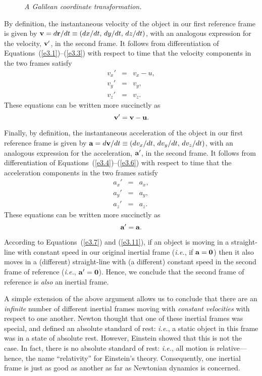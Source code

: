 \begin{figure}
\epsfysize=2.25in
\centerline{}
\caption{\em A Galilean coordinate transformation.}\label{fun1}
\end{figure}

By definition, the instantaneous velocity of the object in our first reference frame is given by
${\bf v} = d{\bf r}/dt \equiv (dx/dt,\,dy/dt,\,dz/dt)$, with an analogous
expression for the velocity, ${\bf v}'$, in the second frame. 
It follows from differentiation of Equations~(\ref{e3.1})--(\ref{e3.3}) with respect to time that the velocity components in the two frames satisfy
\begin{eqnarray}\label{e3.4}
v_x'& = &v_x - u,\\[0.5ex]
v_y' &=& v_y ,\\[0.5ex]
v_z'&=&v_z.\label{e3.6}
\end{eqnarray}
These equations can be written more succinctly as
\begin{equation}\label{e3.7}
{\bf v}' = {\bf v} - {\bf u}.
\end{equation}

Finally, by definition, the instantaneous acceleration of the object in our first reference frame is given by
${\bf a} = d{\bf v}/dt \equiv (dv_x/dt,\,dv_y/dt,\,dv_z/dt)$, with an analogous
expression for the acceleration, ${\bf a}'$, in the second frame. 
It follows from differentiation of Equations~(\ref{e3.4})--(\ref{e3.6}) with respect to time that the acceleration
components in the two frames satisfy
\begin{eqnarray}
a_x'& = &a_x,\\[0.5ex]
a_y' &=& a_y ,\\[0.5ex]
a_z'&=&a_z.
\end{eqnarray}
These equations can be written more succinctly as
\begin{equation}\label{e3.11}
{\bf a}' = {\bf a}.
\end{equation}

According to Equations~(\ref{e3.7}) and (\ref{e3.11}), if an
object is moving  in a straight-line with constant speed in our original
inertial frame ({\em i.e.}, if  ${\bf a}={\bf 0}$) then it also
moves in a (different) straight-line  with (a different) constant speed 
in the second frame of reference ({\em i.e.}, ${\bf a}'= {\bf 0}$). Hence,
we conclude that the second frame of reference is {\em also} an inertial frame.

A simple extension of the above argument allows us to conclude that there
are an {\em infinite}\/ number of different inertial frames moving with {\em constant
velocities}\/ with respect to one another. Newton thought that one of these inertial frames was special, and
defined an absolute standard of rest: {\em i.e.}, a static object in this frame was in a state of absolute rest.
However, Einstein showed that this is not the case. In fact, there is no absolute standard of rest: {\em i.e.}, all
motion is relative---hence, the name ``relativity'' for Einstein's theory. Consequently, one inertial frame is
just as good as another as far as Newtonian dynamics is concerned. 

